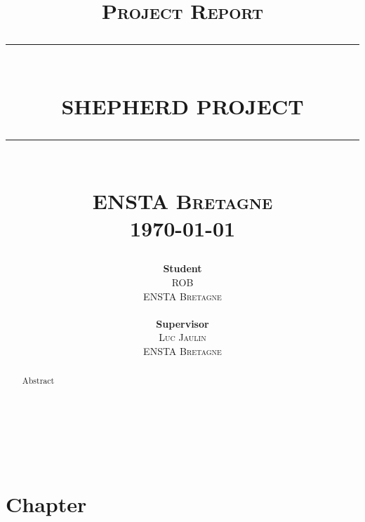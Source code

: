 \documentclass[a4paper]{report}
\begin{document}
\newcommand{\HRule}{\rule{\linewidth}{0.5mm}}

\begin{titlepage}
\title{ \normalsize \textsc{Project Report}
        \\ [1.0cm]
        \HRule{} \\
        \LARGE \textbf{\uppercase{SHEPHERD Project}}
        \HRule{} \\ [0.5cm]
        \textsc{\textbf{ENSTA Bretagne}}\\
		[0.5cm]
        \normalsize \today \vspace*{5\baselineskip}}
        

\date{}

\author{
		\textbf{Student}\\
        \textsc{ROB} \\
        \textsc{ENSTA Bretagne} \\
        \\
        \textbf{Supervisor}\\
        \textsc{Luc Jaulin}\\
        \textsc{ENSTA Bretagne} }

\maketitle
\end{titlepage}

\newpage
~
\thispagestyle{empty}
\newpage

\begin{abstract}

	Abstract

\end{abstract}

\tableofcontents

\newpage

\listoffigures
\thispagestyle{empty}
\setcounter{page}{0}

\newpage

\renewcommand{\arraystretch}{1.5}


~
\thispagestyle{empty}
\setcounter{page}{0}
\newpage

\chapter{Chapter}
\end{document}
